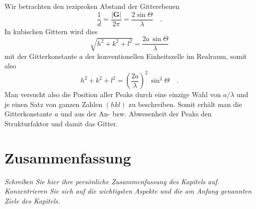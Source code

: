 Wir betrachten den reziproken Abstand der Gitterebenen
\begin{equation}
\frac{1}{d} = \frac{|\mathbf{G}|}{2 \pi} = \frac{2 \sin \Theta}{ \lambda}  \quad .
\end{equation}
In kubischen Gittern wird dies
\begin{equation}
 \sqrt{h^2 + k^2 + l^2} = \frac{2 a \, \sin \Theta}{ \lambda}
\end{equation}
mit der Gitterkonstante $a$ der konventionellen Einheitszelle im Realraum, somit also 
\begin{equation}
 h^2 + k^2 + l^2 = \left(\frac{2 a }{ \lambda} \right)^2 \, \sin^2 \Theta  \quad .
\end{equation}
Man versucht also die Position aller Peaks durch eine einzige Wahl von $a/\lambda$ und je einen Satz von ganzen Zahlen $(hkl)$ zu beschreiben. Somit erhält man die Gitterkonstante $a$ und aus der An- bzw. Abwesenheit der Peaks den Strukturfaktor und damit das Gitter.


 \newpage
\section{Zusammenfassung}

\textit{Schreiben Sie hier ihre persönliche Zusammenfassung des Kapitels auf. Konzentrieren Sie sich auf die wichtigsten Aspekte und die am Anfang genannten Ziele des Kapitels.}

\vspace*{10cm}




\printbibliography[segment=\therefsegment,heading=subbibliography]
